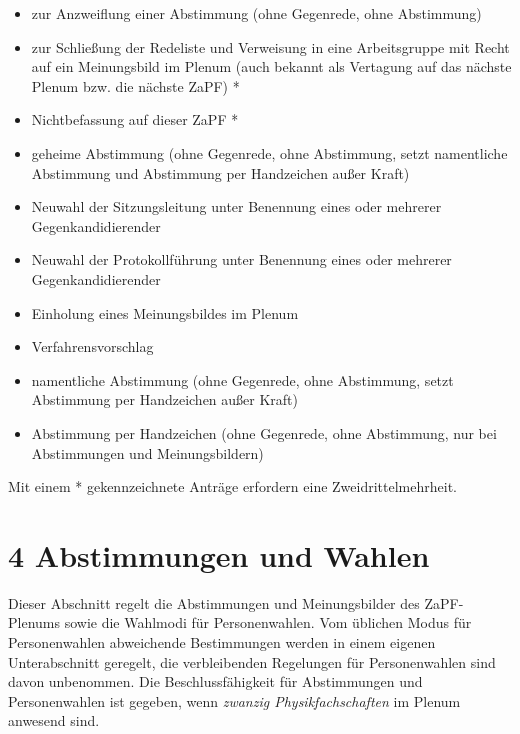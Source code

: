 \documentclass[12pt,oneside]{scrartcl}
\begin{document}
\begin{enumerate}
\begin{itemize}
\item zur Anzweiflung einer Abstimmung (ohne Gegenrede, ohne Abstimmung)

\item zur Schließung der Redeliste und Verweisung in eine Arbeitsgruppe mit
Recht auf ein Meinungsbild im Plenum (auch bekannt als \textquotedbl{}Vertagung auf das
nächste Plenum bzw. die nächste ZaPF\textquotedbl{}) *

\item Nichtbefassung auf dieser ZaPF *

\item geheime Abstimmung (ohne Gegenrede, ohne Abstimmung, setzt namentliche
Abstimmung und Abstimmung per Handzeichen außer Kraft)

\item Neuwahl der Sitzungsleitung unter Benennung eines oder mehrerer Gegenkandidierender

\item Neuwahl der Protokollführung unter Benennung eines oder mehrerer Gegenkandidierender

\item Einholung eines Meinungsbildes im Plenum

\item Verfahrensvorschlag

\item namentliche Abstimmung (ohne Gegenrede, ohne Abstimmung, setzt Abstimmung
per Handzeichen außer Kraft)

\item Abstimmung per Handzeichen (ohne Gegenrede, ohne Abstimmung, nur bei
Abstimmungen und Meinungsbildern)
\end{itemize}

Mit einem * gekennzeichnete Anträge erfordern eine Zweidrittelmehrheit.
\end{enumerate}


\section{4 Abstimmungen und Wahlen%
  \label{abstimmungen-und-wahlen}%
}

Dieser Abschnitt regelt die Abstimmungen und Meinungsbilder des ZaPF-Plenums
sowie die Wahlmodi für Personenwahlen. Vom üblichen Modus für Personenwahlen
abweichende Bestimmungen werden in einem eigenen Unterabschnitt geregelt, die
verbleibenden Regelungen für Personenwahlen sind davon unbenommen. Die
Beschlussfähigkeit für Abstimmungen und Personenwahlen ist gegeben, wenn
\emph{zwanzig Physikfachschaften} im Plenum anwesend sind.
\end{document}
